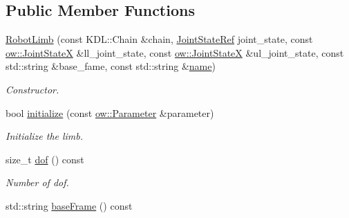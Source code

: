 \subsection*{Public Member Functions}
\begin{DoxyCompactItemize}
\item 
\hyperlink{classow__ik_1_1RobotLimb_a951b3838cd479272f6a6cfdc8ca334dc}{Robot\+Limb} (const K\+D\+L\+::\+Chain \&chain, \hyperlink{classow__core_1_1JointStateRef}{Joint\+State\+Ref} joint\+\_\+state, const \hyperlink{classow__core_1_1JointState}{ow\+::\+Joint\+StateX} \&ll\+\_\+joint\+\_\+state, const \hyperlink{classow__core_1_1JointState}{ow\+::\+Joint\+StateX} \&ul\+\_\+joint\+\_\+state, const std\+::string \&base\+\_\+fame, const std\+::string \&\hyperlink{classow__ik_1_1RobotLimb_a3aaf05a2d919e792562226691ce1d0ad}{name})\hypertarget{classow__ik_1_1RobotLimb_a951b3838cd479272f6a6cfdc8ca334dc}{}\label{classow__ik_1_1RobotLimb_a951b3838cd479272f6a6cfdc8ca334dc}

\begin{DoxyCompactList}\small\item\em Constructor. \end{DoxyCompactList}\item 
bool \hyperlink{classow__ik_1_1RobotLimb_a2e7c4f18d15bd54af5aa02fed02639b4}{initialize} (const \hyperlink{classow_1_1Parameter}{ow\+::\+Parameter} \&parameter)\hypertarget{classow__ik_1_1RobotLimb_a2e7c4f18d15bd54af5aa02fed02639b4}{}\label{classow__ik_1_1RobotLimb_a2e7c4f18d15bd54af5aa02fed02639b4}

\begin{DoxyCompactList}\small\item\em Initialize the limb. \end{DoxyCompactList}\item 
size\+\_\+t \hyperlink{classow__ik_1_1RobotLimb_aa29bc28563188c994df1fd4b50b3ec8e}{dof} () const \hypertarget{classow__ik_1_1RobotLimb_aa29bc28563188c994df1fd4b50b3ec8e}{}\label{classow__ik_1_1RobotLimb_aa29bc28563188c994df1fd4b50b3ec8e}

\begin{DoxyCompactList}\small\item\em Number of dof. \end{DoxyCompactList}\item 
std\+::string \hyperlink{classow__ik_1_1RobotLimb_a3a3154e6e2149ebe5af13ef707c29af2}{base\+Frame} () const \hypertarget{classow__ik_1_1RobotLimb_a3a3154e6e2149ebe5af13ef707c29af2}{}\label{classow__ik_1_1RobotLimb_a3a3154e6e2149ebe5af13ef707c29af2}


\end{DoxyCompactItemize}

